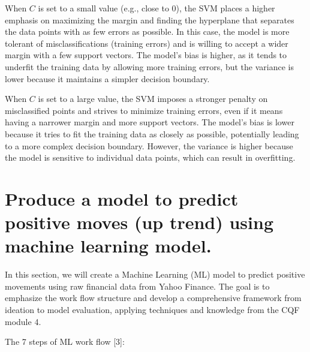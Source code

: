 \documentclass[11pt]{article}
\begin{document}
    When \(C\) is set to a small value (e.g., close to 0), the SVM places a
higher emphasis on maximizing the margin and finding the hyperplane that
separates the data points with as few errors as possible. In this case,
the model is more tolerant of misclassifications (training errors) and
is willing to accept a wider margin with a few support vectors. The
model's bias is higher, as it tends to underfit the training data by
allowing more training errors, but the variance is lower because it
maintains a simpler decision boundary.

When \(C\) is set to a large value, the SVM imposes a stronger penalty
on misclassified points and strives to minimize training errors, even if
it means having a narrower margin and more support vectors. The model's
bias is lower because it tries to fit the training data as closely as
possible, potentially leading to a more complex decision boundary.
However, the variance is higher because the model is sensitive to
individual data points, which can result in overfitting.

\pagebreak

    \hypertarget{produce-a-model-to-predict-positive-moves-up-trend-using-machine-learning-model.}{%
\section{Produce a model to predict positive moves (up trend) using
machine learning
model.}\label{produce-a-model-to-predict-positive-moves-up-trend-using-machine-learning-model.}}

    In this section, we will create a Machine Learning (ML) model to predict
positive movements using raw financial data from Yahoo Finance. The goal is to emphasize the work flow structure and develop a comprehensive framework from ideation to model evaluation, applying techniques and knowledge from the CQF module 4.

    The 7 steps of ML work flow {[}3{]}:
\end{document}
